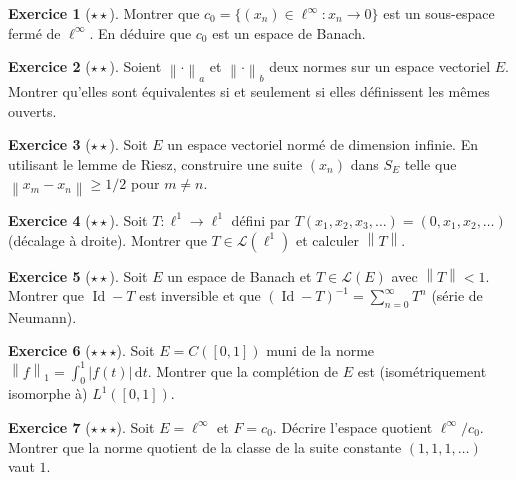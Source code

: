 \documentclass[a4paper,12pt]{book}
\DeclareMathOperator{\Id}{Id}
\newcommand{\dd}{\mathrm{d}}
\newcommand{\norm}[1]{\left\| #1 \right\|}
\newcommand{\abs}[1]{\left| #1 \right|}
\theoremstyle{definition}
\newtheorem{exercice}{Exercice}[chapter]
\theoremstyle{plain}
\theoremstyle{remark}
\begin{document}
\begin{exercice}[$\star\star$]\label{exo:ch1-sous-espace-ferme}
Montrer que $c_0 = \{(x_n) \in \ell^\infty : x_n \to 0\}$ est un sous-espace fermé de $\ell^\infty$. En déduire que $c_0$ est un espace de Banach.
\end{exercice}

\begin{exercice}[$\star\star$]\label{exo:ch1-normes-equiv}
Soient $\norm{\cdot}_a$ et $\norm{\cdot}_b$ deux normes sur un espace vectoriel $E$. Montrer qu'elles sont équivalentes si et seulement si elles définissent les mêmes ouverts.
\end{exercice}

\begin{exercice}[$\star\star$]\label{exo:ch1-riesz-dim-infinie}
Soit $E$ un espace vectoriel normé de dimension infinie. En utilisant le lemme de Riesz, construire une suite $(x_n)$ dans $S_E$ telle que $\norm{x_m - x_n} \geq 1/2$ pour $m \neq n$.
\end{exercice}

\begin{exercice}[$\star\star$]\label{exo:ch1-operateur-exemple}
Soit $T : \ell^1 \to \ell^1$ défini par $T(x_1, x_2, x_3, \ldots) = (0, x_1, x_2, \ldots)$ (décalage à droite). Montrer que $T \in \mathcal{L}(\ell^1)$ et calculer $\norm{T}$.
\end{exercice}

\begin{exercice}[$\star\star$]\label{exo:ch1-series-operateurs}
Soit $E$ un espace de Banach et $T \in \mathcal{L}(E)$ avec $\norm{T} < 1$. Montrer que $\Id - T$ est inversible et que $(\Id - T)^{-1} = \sum_{n=0}^{\infty} T^n$ (série de Neumann).
\end{exercice}

\begin{exercice}[$\star\star\star$]\label{exo:ch1-completion-explicite}
Soit $E = C([0,1])$ muni de la norme $\norm{f}_1 = \int_0^1 \abs{f(t)}\,\dd t$. Montrer que la complétion de $E$ est (isométriquement isomorphe à) $L^1([0,1])$.
\end{exercice}

\begin{exercice}[$\star\star\star$]\label{exo:ch1-quotient}
Soit $E = \ell^\infty$ et $F = c_0$. Décrire l'espace quotient $\ell^\infty / c_0$. Montrer que la norme quotient de la classe de la suite constante $(1,1,1,\ldots)$ vaut $1$.
\end{exercice}
\end{document}
